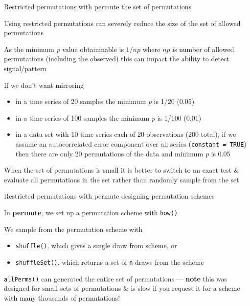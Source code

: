\documentclass[10pt,ignorenonframetext,compress, aspectratio=169]{beamer}
\begin{document}
\begin{frame}{Restricted permutations with permute \textbar{} the set of
permutations}

Using restricted permutations can severely reduce the size of the set of
allowed permutations

As the minimum \emph{p} value obtaininable is $1 / np$ where $np$ is
number of allowed permutations (including the observed) this can impact
the ability to detect signal/pattern

If we don't want mirroring

\begin{itemize}
\itemsep1pt\parskip0pt
\item
  in a time series of 20 samples the minimum \emph{p} is 1/20 (0.05)
\item
  in a time series of 100 samples the minimum \emph{p} is 1/100 (0.01)
\item
  in a data set with 10 time series each of 20 observations (200 total),
  if we assume an autocorrelated error component over all series
  (\texttt{constant = TRUE}) then there are only 20 permutations of the
  data and minimum \emph{p} is 0.05
\end{itemize}

When the set of permutations is small it is better to switch to an exact
test \& evaluate all permutations in the set rather than randomly sample
from the set

\end{frame}

\begin{frame}{Restricted permutations with permute \textbar{} designing
permutation schemes}

In \textbf{permute}, we set up a permutation scheme with \texttt{how()}

We sample from the permutation scheme with

\begin{itemize}
\itemsep1pt\parskip0pt
\item
  \texttt{shuffle()}, which gives a single draw from scheme, or
\item
  \texttt{shuffleSet()}, which returns a set of \texttt{n} draws from
  the scheme
\end{itemize}

\texttt{allPerms()} can generated the entire set of permutations ---
\textbf{note} this was designed for small sets of permutations \& is
slow if you request it for a scheme with many thousands of permutations!

\end{frame}
\end{document}
